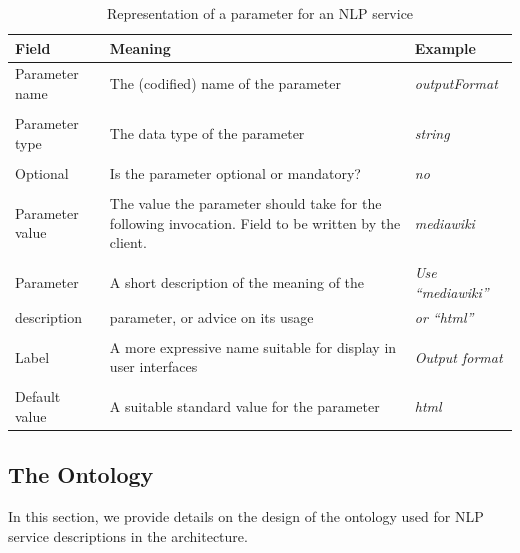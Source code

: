 \begin{table}[htb]
 \centering\small\sffamily
 \begin{tabular}{p{}@{\hspace*{4mm}}p{}@{\hspace*{4mm}}p{}}
   \toprule
   \textbf{Field} & \textbf{Meaning} & \textbf{Example} \\
   \midrule
   Parameter name & The (codified) name of the parameter &
   \emph{outputFormat} \\

   & & \\

   Parameter type & The data type of the parameter & \emph{string} \\

   & & \\

   Optional & Is the parameter optional or mandatory?  & \emph{no} \\

   & & \\

   Parameter value & The value the parameter should take for the
   following invocation. Field to be written by the client. &
   \emph{mediawiki} \\

   & & \\

   Parameter & A short description of the meaning of the & \emph{Use ``mediawiki''} \\
   description & parameter, or advice on its usage & \emph{ or ``html''} \\

   & & \\

   Label & A more expressive name suitable for display in user
   interfaces & \emph{Output format} \\

   & & \\

   Default value & A suitable standard value for the parameter & \emph{html} \\

   \bottomrule
\end{tabular}
 \caption{Representation of a parameter for an NLP service}
 \label{tab:param}
\end{table}

\subsection{The \sa Ontology}
In this section, we provide details on the design of the ontology
used for NLP service descriptions in the \sa architecture.

